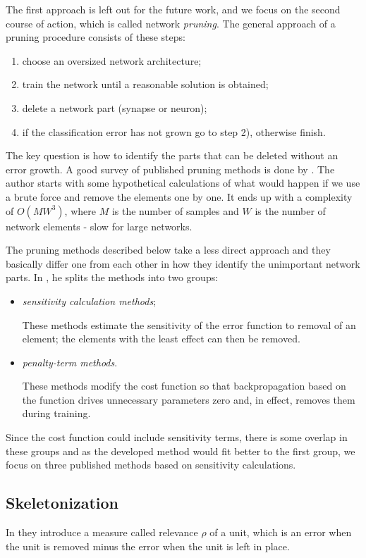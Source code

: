 The first approach is left out for the future work, and we focus on the second course of action, which is called network \textit{pruning}. The general approach of a pruning procedure consists of these steps:

\begin{enumerate}
\item choose an oversized network architecture;
\item train the network until a reasonable solution is obtained;
\item delete a network part (synapse or neuron);
\item if the classification error has not grown go to step 2), otherwise finish.
\end{enumerate}

The key question is how to identify the parts that can be deleted without an error growth. A good survey of published pruning methods is done by \citep{reed:pa_survey}. The author starts with some hypothetical calculations of what would happen if we use a brute force and remove the elements one by one. It ends up with a complexity of $ O(MW^3) $, where $ M $ is the number of samples and $ W $ is the number of network elements - slow for large networks. 

The pruning methods described below take a less direct approach and they basically differ one from each other in how they identify the unimportant network parts. In \citep{reed:pa_survey}, he splits the methods into two groups:
\begin{itemize}
\item \textit{sensitivity calculation methods};

These methods estimate the sensitivity of the error function to removal of an element; the elements with the least effect can then be removed.
 
\item \textit{penalty-term methods}.

These methods modify the cost function so that backpropagation based on the function drives unnecessary parameters zero and, in effect, removes them during training.
\end{itemize}

Since the cost function could include sensitivity terms, there is some overlap in these groups and as the developed method would fit better to the first group, we focus on three published methods based on sensitivity calculations.

\subsection*{Skeletonization} \label{ssec:skeletonization}
In \citep{mozer:skeletonization} they introduce a measure called relevance $ \rho $ of a unit, which is an error when the unit is removed minus the error when the unit is left in place.

